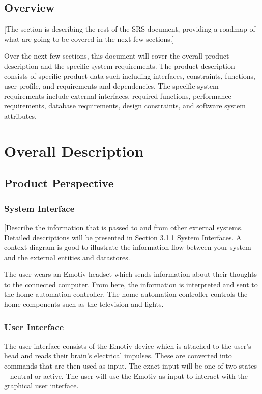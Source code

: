 \documentclass{report}
\begin{document}
\subsection{Overview}
[The section is describing the rest of the SRS document, providing a roadmap of what are going to be 
covered in the next few sections.]

Over the next few sections, this document will cover the overall product description and the 
specific system requirements. The product description consists of specific product data such including 
interfaces, constraints, functions, user profile, and requirements and dependencies. The specific system 
requirements include external interfaces, required functions, performance requirements, database 
requirements, design constraints, and software system attributes.

\newpage

\section{Overall Description}

\subsection{Product Perspective}

\subsubsection{System Interface}

[Describe the information that is passed to and from other external systems. Detailed descriptions 
will be presented in Section 3.1.1 System Interfaces. A context diagram is good to illustrate the 
information flow between your system and the external entities and datastores.]

The user wears an Emotiv headset which sends information about their thoughts to the connected computer. From here, the information is interpreted and sent to the home automation controller. The home automation controller controls the home components such as the television and lights. 

\subsubsection{User Interface}

	The user interface consists of the Emotiv device which is attached to the user's head and reads their brain's electrical impulses. These are converted into commands that are then used as input. The exact input will be one of two states – neutral or active. The user will use the Emotiv as input to interact with the graphical user interface.
\end{document}
